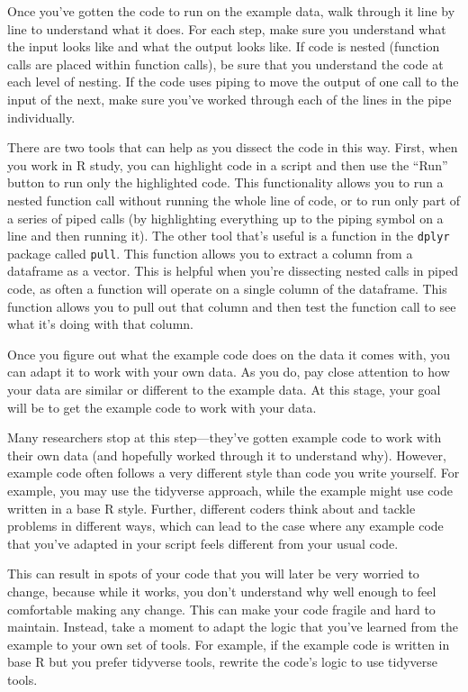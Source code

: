 \documentclass[]{tufte-book}
\begin{document}
Once you've gotten the code to run on the example data, walk through it line
by line to understand what it does. For each step, make sure you understand
what the input looks like and what the output looks like. If code is nested
(function calls are placed within function calls), be sure that you understand
the code at each level of nesting. If the code uses piping to move the output
of one call to the input of the next, make sure you've worked through each
of the lines in the pipe individually.

There are two tools that can help as you dissect the code in this way. First,
when you work in R study, you can highlight code in a script and then use the
``Run'' button to run only the highlighted code. This functionality allows you to
run a nested function call without running the whole line of code, or to run
only part of a series of piped calls (by highlighting everything up to the
piping symbol on a line and then running it). The other tool that's useful is a
function in the \texttt{dplyr} package called \texttt{pull}. This function allows you to
extract a column from a dataframe as a vector. This is helpful when you're
dissecting nested calls in piped code, as often a function will operate on a
single column of the dataframe. This function allows you to pull out that column
and then test the function call to see what it's doing with that column.

Once you figure out what the example code does on the data it comes with, you
can adapt it to work with your own data. As you do, pay close attention to
how your data are similar or different to the example data. At this stage, your
goal will be to get the example code to work with your data.

Many researchers stop at this step---they've gotten example code to work with
their own data (and hopefully worked through it to understand why). However,
example code often follows a very different style than code you write yourself.
For example, you may use the tidyverse approach, while the example might use
code written in a base R style. Further, different coders think about and
tackle problems in different ways, which can lead to the case where any
example code that you've adapted in your script feels different from your usual
code.

This can result in spots of your code that you will later be very worried to
change, because while it works, you don't understand why well enough to feel
comfortable making any change. This can make your code fragile and hard to
maintain. Instead, take a moment to adapt the logic that you've learned from
the example to your own set of tools. For example, if the example code is
written in base R but you prefer tidyverse tools, rewrite the code's logic
to use tidyverse tools.
\end{document}
